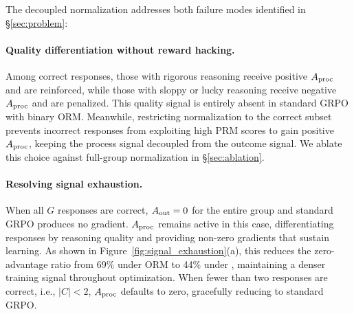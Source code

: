 The decoupled normalization addresses both failure modes identified in \S\ref{sec:problem}:

\paragraph{Quality differentiation without reward hacking.} Among correct responses, those with rigorous reasoning receive positive $\aproc$ and are reinforced, while those with sloppy or lucky reasoning receive negative $\aproc$ and are penalized. This quality signal is entirely absent in standard GRPO with binary ORM. Meanwhile, restricting normalization to the correct subset prevents incorrect responses from exploiting high PRM scores to gain positive $\aproc$, keeping the process signal decoupled from the outcome signal. We ablate this choice against full-group normalization in \S\ref{sec:ablation}.

\paragraph{Resolving signal exhaustion.} When all $G$ responses are correct, $\aout = 0$ for the entire group and standard GRPO produces no gradient. $\aproc$ remains active in this case, differentiating responses by reasoning quality and providing non-zero gradients that sustain learning. As shown in Figure~\ref{fig:signal_exhaustion}(a), this reduces the zero-advantage ratio from 69\% under ORM to 44\% under \method{}, maintaining a denser training signal throughout optimization. When fewer than two responses are correct, i.e., $|C| < 2$, $\aproc$ defaults to zero, gracefully reducing to standard GRPO.
